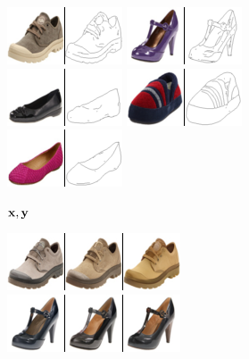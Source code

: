   \begin{figure}[t]
    \centering
    \begin{subfigure}[t]{0.2\textwidth}
      \centering
      \includegraphics[height=\edgesstuffimgheight]{figs/cigcvae/image-samples/shoes/image_aipo_0_imagenet_gt_masked.png}
      \includegraphics[height=\edgesstuffimgheight]{figs/cigcvae/image-samples/shoes/image_aipo_1_imagenet_gt_masked.png}
      \includegraphics[height=\edgesstuffimgheight]{figs/cigcvae/image-samples/shoes/image_aipo_2_imagenet_gt_masked.png}
      \includegraphics[height=\edgesstuffimgheight]{figs/cigcvae/image-samples/shoes/image_aipo_3_imagenet_gt_masked.png}
      \includegraphics[height=\edgesstuffimgheight]{figs/cigcvae/image-samples/shoes/image_aipo_4_imagenet_gt_masked.png}
      \caption{\scriptsize ${\mathbf{x}}, {\mathbf{y}}$}
    \end{subfigure}
    \begin{subfigure}[t]{0.25\textwidth}
      \centering
      \includegraphics[height=\edgesstuffimgheight]{figs/cigcvae/image-samples/shoes/image_aipo_0_t=0.85_imagenet_samples.png}
      \includegraphics[height=\edgesstuffimgheight]{figs/cigcvae/image-samples/shoes/image_aipo_1_t=0.85_imagenet_samples.png}

\end{subfigure}
\end{figure}
